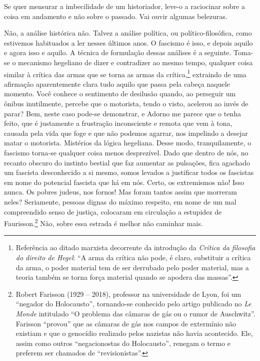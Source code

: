 Se quer mensurar a imbecilidade de um historiador, leve-o a raciocinar
sobre a coisa em andamento e não sobre o passado. Vai ouvir algumas
belezuras.

Não, a análise histórica não. Talvez a análise política, ou
político-filosófica, como estivemos habituados a ler nesses últimos
anos. O fascismo é isso, e depois aquilo e agora isso e aquilo. A
técnica de formulação dessas análises é a seguinte. Toma-se o mecanismo
hegeliano de dizer e contradizer ao mesmo tempo, qualquer coisa similar
à crítica das armas que se torna as armas da crítica,\footnote{Referência ao ditado marxista decorrente da introdução da
  \emph{Crítica da filosofia do direito de Hegel}: ``A arma da crítica
  não pode, é claro, substituir a crítica da arma, o poder material tem
  de ser derrubado pelo poder material, mas a teoria também se torna
  força material quando se apodera das massas''.} extraindo de uma afirmação aparentemente clara tudo
aquilo que passa pela cabeça naquele momento. Você conhece o sentimento
de desilusão quando, ao perseguir um ônibus inutilmente, percebe que o
motorista, tendo o visto, acelerou ao invés de parar? Bem, neste caso
pode-se demonstrar, e Adorno me parece que o tenha feito, que é
justamente a frustração inconsciente e remota que vem à tona, causada
pela vida que foge e que não podemos agarrar, nos impelindo a desejar
matar o motorista. Mistérios da lógica hegeliana. Desse modo,
tranquilamente, o fascismo torna-se qualquer coisa menos desprezível.
Dado que dentro de nós, no recanto obscuro do instinto bestial que faz
aumentar as pulsações, fica agachado um fascista desconhecido a si
mesmo, somos levados a justificar todos os fascistas em nome do
potencial fascista que há em nós. Certo, os extremismos não! Isso nunca.
Os pobres judeus, nos fornos! Mas foram tantos assim que morreram neles?
Seriamente, pessoas dignas do máximo respeito, em nome de um mal
compreendido senso de justiça, colocaram em circulação a estupidez de
Faurisson.\footnote{Robert Farisson (1929 -- 2018), professor na universidade de Lyon, foi
  um ``negador do Holocausto'', tornando-se conhecido pelo artigo
  publicado no \emph{Le Monde} intitulado ``O problema das câmaras de
  gás ou o rumor de Auschwitz''. Farisson ``provou'' que as câmaras de
  gás nos campos de extermínio não existiam e que o genocídio realizado
  pelos nazistas não havia acontecido. Ele, assim como outros
  ``negacionostas do Holocausto'', renegam o termo e preferem ser
  chamados de ``revisionistas''.} Não, sobre essa estrada é melhor não caminhar mais.


